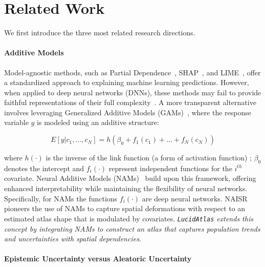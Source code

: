 \section{Related Work}
We first introduce the three most related research directions. 

\paragraph{Additive Models}
Model-agnostic methods, such as Partial Dependence~\citep{friedman2001greedy}, SHAP~\citep{lundberg2017unified}, and LIME~\citep{ribeiro2016should}, offer a standardized approach to explaining machine learning predictions. However, when applied to deep neural networks (DNNs), these methods may fail to provide faithful representations of their full complexity~\citep{rudin2019stop}. A more transparent alternative involves leveraging Generalized Additive Models (GAMs)~\citep{hastie2017generalized}, where the response variable \( y \) is modeled using an additive structure:  
\begin{small}
\begin{equation}
E[y | c_1, . . . , c_N] = h(\beta_0 + f_1(c_1) + \dots + f_N(c_N))
\label{eq.nam}
\end{equation}
\end{small}
where \( h(\cdot) \) is the inverse of the link function (a form of activation function) ; $\beta_0$ denotes the intercept and $f_{i}(\cdot)$ represent independent functions for the $i^{th}$ covariate. Neural Additive Models (NAMs)~\citep{agarwal2020neural, jiao2023naisr} build upon this framework, offering enhanced interpretability while maintaining the flexibility of neural networks. Specifically, for NAMs the functions $f_i(\cdot)$ are deep neural networks. NAISR~\citep{jiao2023naisr} pioneers the use of NAMs to capture spatial deformations with respect to an estimated atlas shape that is modulated by covariates. \emph{\texttt{LucidAtlas} extends this concept by integrating NAMs to construct an atlas that captures population trends and uncertainties with spatial dependencies}.

\paragraph{Epistemic Uncertainty versus Aleatoric Uncertainty}

